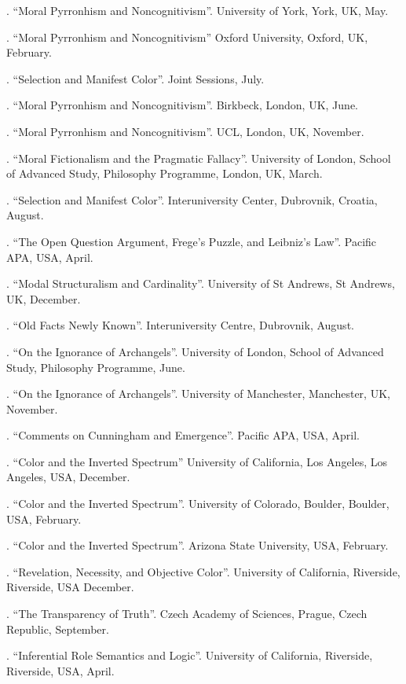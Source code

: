\documentclass[11pt]{article}
\begin{document}
. ``Moral Pyrronhism and Noncognitivism''. University of York, York, UK, May.

. ``Moral Pyrronhism and Noncognitivism'' Oxford University, Oxford, UK, February.

. ``Selection and Manifest Color''. Joint Sessions, July.

. ``Moral Pyrronhism and Noncognitivism''. Birkbeck, London, UK, June.

. ``Moral Pyrronhism and Noncognitivism''. UCL, London, UK, November.

. ``Moral Fictionalism and the Pragmatic Fallacy''. University of London, School of Advanced Study, Philosophy Programme, London, UK, March.

. ``Selection and Manifest Color''. Interuniversity Center, Dubrovnik, Croatia, August.

. ``The Open Question Argument, Frege's Puzzle, and Leibniz's Law''. Pacific APA, USA, April.

. ``Modal Structuralism and Cardinality''.  University of St Andrews, St Andrews, UK, December.

. ``Old Facts Newly Known''. Interuniversity Centre, Dubrovnik, August.

. ``On the Ignorance of Archangels''. University of London, School of Advanced Study, Philosophy Programme, June.

. ``On the Ignorance of Archangels''. University of Manchester, Manchester, UK, November.

. ``Comments on Cunningham and Emergence''. Pacific APA, USA, April.

. ``Color and the Inverted Spectrum'' University of California, Los Angeles, Los Angeles, USA, December.

. ``Color and the Inverted Spectrum''. University of Colorado, Boulder, Boulder, USA, February.

. ``Color and the Inverted Spectrum''. Arizona State University, USA, February.

. ``Revelation, Necessity, and Objective Color''. University of California, Riverside, Riverside, USA December.

. ``The Transparency of Truth''. Czech Academy of Sciences, Prague, Czech Republic, September.

. ``Inferential Role Semantics and Logic''. University of California, Riverside, Riverside, USA, April.
\end{document}
